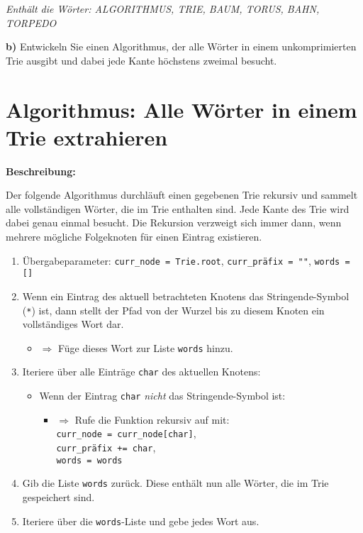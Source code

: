 \vspace{1cm}
\begin{center}
\small\textit{Enthält die Wörter: ALGORITHMUS, TRIE, BAUM, TORUS, BAHN, TORPEDO}
\end{center}





\noindent
\textbf{b)} Entwickeln Sie einen Algorithmus, der alle Wörter in einem unkomprimierten Trie ausgibt und dabei jede Kante höchstens zweimal besucht.\\


\section*{Algorithmus: Alle Wörter in einem Trie extrahieren}

\textbf{Beschreibung:}

Der folgende Algorithmus durchläuft einen gegebenen Trie rekursiv und sammelt alle vollständigen Wörter, die im Trie enthalten sind. Jede Kante des Trie wird dabei genau einmal besucht. Die Rekursion verzweigt sich immer dann, wenn mehrere mögliche Folgeknoten für einen Eintrag existieren.

\begin{enumerate}
    \item Übergabeparameter: \texttt{curr\_node = Trie.root}, \texttt{curr\_pr\"afix = ""}, \texttt{words = []}
    \item Wenn ein Eintrag des aktuell betrachteten Knotens das Stringende-Symbol (\texttt{*}) ist, dann stellt der Pfad von der Wurzel bis zu diesem Knoten ein vollständiges Wort dar.
    \begin{itemize}
        \item $\Rightarrow$ Füge dieses Wort zur Liste \texttt{words} hinzu.
    \end{itemize}
    \item Iteriere über alle Einträge \texttt{char} des aktuellen Knotens:
    \begin{itemize}
        \item Wenn der Eintrag \texttt{char} \emph{nicht} das Stringende-Symbol ist:
        \begin{itemize}
            \item $\Rightarrow$ Rufe die Funktion rekursiv auf mit: \\
            \texttt{curr\_node = curr\_node[char]}, \\
            \texttt{curr\_pr\"afix += char}, \\
            \texttt{words = words}
        \end{itemize}
    \end{itemize}
    \item Gib die Liste \texttt{words} zurück. Diese enthält nun alle Wörter, die im Trie gespeichert sind.
    \item Iteriere über die \texttt{words}-Liste und gebe jedes Wort aus.
\end{enumerate}

